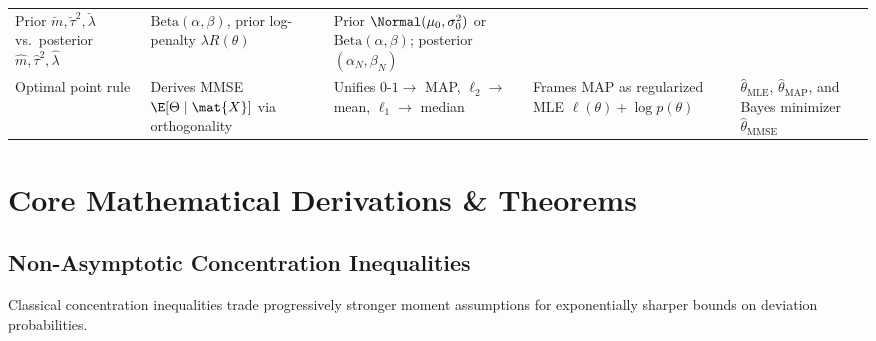 \documentclass[../../../../master.tex]{subfiles}
\begin{document}
\begin{crossbook}
\begin{center}
\begin{tabularx}{\textwidth}{@{}>{\raggedright\arraybackslash}p{2.3cm} >{\raggedright\arraybackslash}p{3.0cm} >{\raggedright\arraybackslash}p{3.1cm} >{\raggedright\arraybackslash}p{2.8cm} >{\raggedright\arraybackslash}X@{}}
Prior $\breve{m}, \breve{\tau}^2, \breve{\lambda}$ vs.\ posterior $\hat{m}, \hat{\tau}^2, \hat{\lambda}$ &
$\mathrm{Beta}(\alpha,\beta)$, prior log-penalty $\lambda R(\theta)$ &
Prior $\Normal(\mu_0, \sigma_0^2)$ or $\mathrm{Beta}(\alpha,\beta)$; posterior $(\alpha_N, \beta_N)$ \\
Optimal point rule &
Derives MMSE $\E[\Theta\mid\mat{X}]$ via orthogonality &
Unifies $0\text{-}1 \to$ MAP, $\ell_2 \to$ mean, $\ell_1 \to$ median &
Frames MAP as regularized MLE $\ell(\theta) + \log p(\theta)$ &
$\hat{\theta}_{\mathrm{MLE}}$, $\hat{\theta}_{\mathrm{MAP}}$, and Bayes minimizer $\hat{\theta}_{\mathrm{MMSE}}$ \\
\bottomrule
\end{tabularx}
\endgroup
\end{center}
\end{crossbook}

\section{Core Mathematical Derivations \& Theorems}
\label{sec:asymp:derivations}

\subsection{Non-Asymptotic Concentration Inequalities}
\label{sec:asymp:concentration}

Classical concentration inequalities trade progressively stronger moment assumptions for exponentially sharper bounds on deviation probabilities.
\end{document}
